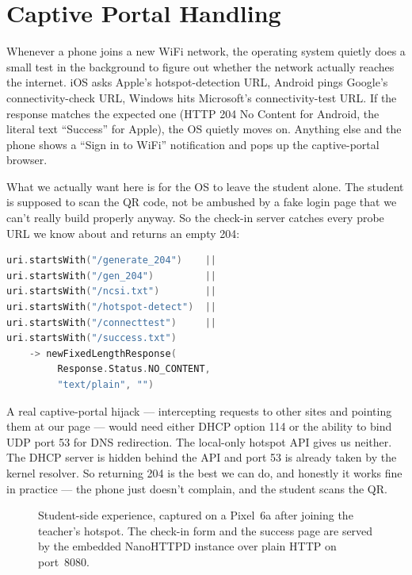 \documentclass[sigconf,10pt]{acmart}
\begin{document}
\section{Captive Portal Handling}

Whenever a phone joins a new WiFi network, the operating system
quietly does a small test in the background to figure out whether
the network actually reaches the internet. iOS asks Apple's
hotspot-detection URL, Android pings Google's connectivity-check
URL, Windows hits Microsoft's connectivity-test URL. If the
response matches the expected one (HTTP 204 No Content for
Android, the literal text ``Success'' for Apple), the OS quietly
moves on. Anything else and the phone shows a ``Sign in to WiFi''
notification and pops up the captive-portal browser.

What we actually want here is for the OS to leave the student
alone. The student is supposed to scan the QR code, not be
ambushed by a fake login page that we can't really build properly
anyway. So the check-in server catches every probe URL we know
about and returns an empty 204:

\begin{lstlisting}[language=Kotlin]
uri.startsWith("/generate_204")    ||
uri.startsWith("/gen_204")         ||
uri.startsWith("/ncsi.txt")        ||
uri.startsWith("/hotspot-detect")  ||
uri.startsWith("/connecttest")     ||
uri.startsWith("/success.txt")
    -> newFixedLengthResponse(
         Response.Status.NO_CONTENT,
         "text/plain", "")
\end{lstlisting}

A real captive-portal hijack --- intercepting requests to other
sites and pointing them at our page --- would need either DHCP
option 114 or the ability to bind UDP port 53 for DNS redirection.
The local-only hotspot API gives us neither. The DHCP server is
hidden behind the API and port 53 is already taken by the kernel
resolver. So returning 204 is the best we can do, and honestly it
works fine in practice --- the phone just doesn't complain, and
the student scans the QR.

\begin{figure}[t]
  \centering
  \caption{Student-side experience, captured on a Pixel~6a after
    joining the teacher's hotspot. The check-in form and the success
    page are served by the embedded NanoHTTPD instance over plain
    HTTP on port~8080.}
  \label{fig:checkin}
\end{figure}
\end{document}
